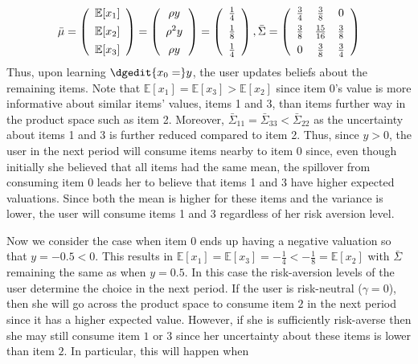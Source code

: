 \documentclass{article}
\begin{document}
\[ \bar{\mu} =   \left (\begin{array}{c}
\mathbb{E}[x_1] \vspace{0.15cm} \\
\mathbb{E}[x_2] \vspace{0.15cm} \\
\mathbb{E}[x_3]
\end{array}  \right) =\left (\begin{array}{c}
\rho y  \vspace{0.15cm} \\
\rho^{2} y  \vspace{0.15cm} \\
 \rho y \\
\end{array} \right) =
\left (\begin{array}{c}
\frac{1}{4} \vspace{0.15cm} \\
\frac{1}{8}  \vspace{0.15cm} \\
\frac{1}{4}
\end{array}  \right), \bar{\Sigma} =  \left( \begin{array}{ccc}
\frac{3}{4} & \frac{3}{8} & 0 \vspace{0.15cm} \\
\frac{3}{8} & \frac{15}{16} & \frac{3}{8} \vspace{0.15cm}  \\
0 &\frac{3}{8} & \frac{3}{4}  \\
\end{array} \right)
\]
Thus, upon learning $\dgedit{x_0=}y$, the user updates beliefs about the remaining items. Note that $\mathbb{E}[x_1] = \mathbb{E}[x_3] > \mathbb{E}[x_2]$ since item 0's value is more informative about similar items' values, items 1 and 3, than items further way in the product space such as item 2. Moreover, $\bar{\Sigma}_{11} = \bar{\Sigma}_{33} < \bar{\Sigma}_{22}$ as the uncertainty about items 1 and 3 is further reduced compared to item 2. Thus, since $y > 0$, the user in the next period will consume items nearby to item 0 since, even though initially she believed that all items had the same mean, the spillover from consuming item 0 leads her to believe that items 1 and 3 have higher expected valuations. Since both the mean is higher for these items and the variance is lower, the user will consume items 1 and 3 regardless of her risk aversion level.
\par 
Now we consider the case when item 0 ends up having a negative valuation so that $y = -0.5 < 0$. This results in $\mathbb{E}[x_1] = \mathbb{E}[x_3] = -\frac{1}{4} <  -\frac{1}{8} = \mathbb{E}[x_2]$ with $\bar{\Sigma}$ remaining the same as when $y = 0.5$. In this case the risk-aversion levels of the user determine the choice in the next period. If the user is risk-neutral ($\gamma = 0$), then she will go across the product space to consume item $2$ in the next period since it has a higher expected value. However, if she is sufficiently risk-averse then she may still consume item $1$ or $3$ since her uncertainty about these items is lower than item $2$. In particular, this will happen when 
\end{document}

